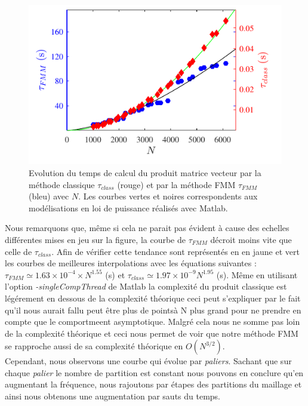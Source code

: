 \documentclass[10pt]{article}
\begin{document}
\begin{multicols}{2}
\begin{figure}[H]
  \begin{center}
  \includegraphics[width=0.95\columnwidth]{Q7.pdf}
  \vspace*{-11pt}
  \caption{Evolution du temps de calcul du produit matrice vecteur par la méthode classique $\tau_{class}$ (rouge) et par la méthode FMM $\tau_{FMM}$ (bleu) avec $N$. Les courbes vertes et noires correspondents aux modélisations en loi de puissance réalisés avec Matlab.}
  \label{fig:Q7}
  \end{center}
\end{figure}
\vspace*{-22pt}

Nous remarquons que, même si cela ne parait pas évident à cause des echelles différentes mises en jeu sur la figure, la courbe de $\tau_{FMM}$ décroit moins vite que celle de $\tau_{class}$. Afin de vérifier cette tendance sont représentés en en jaune et vert les courbes de meilleures interpolations avec les équations suivantes : $\tau_{FMM} \simeq 1.63\times10^{-4} \times N^{1.55}$ (s) et $\tau_{class} \simeq 1.97\times10^{-9}  N^{1.95}$ (s). Même en utilisant l'option \textit{-singleCompThread} de Matlab la complexité du produit classique est légérement en dessous de la complexité théorique ceci peut s'expliquer par le fait qu'il nous aurait fallu peut être plus de pointsà N plus grand pour ne prendre en compte que le comportmeent asymptotique. Malgré cela nous ne somme pas loin de la complexité théorique et ceci nous permet de voir que notre méthode FMM se rapproche aussi de sa complexité théorique en $O(N^{3/2})$. \\
\indent
Cependant, nous observons une courbe qui évolue par \textit{paliers}. Sachant que sur chaque \textit{palier} le nombre de partition est constant nous pouvons en conclure qu'en augmentant la fréquence, nous rajoutons par étapes des partitions du maillage et ainsi nous obtenons une augmentation par sauts du temps. \\


\end{multicols}
\end{document}
